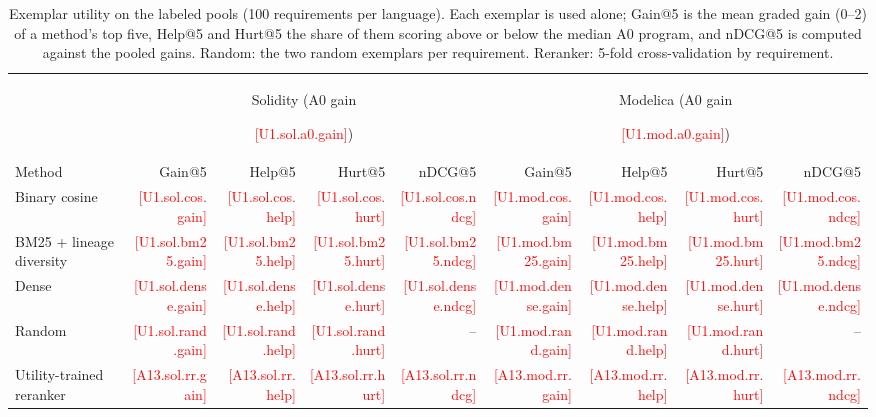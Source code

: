 \documentclass[runningheads]{llncs}
\newcommand{\tbd}[1]{\ifbool{submission}%
  {\PackageError{forge}{Unfilled placeholder #1}{See the runbook placeholder table.}}%
  {\mbox{\textcolor{red}{\textsf{\tiny[#1]}}}}}
\begin{document}
\begin{table}[t]
\centering
\caption{Exemplar utility on the labeled pools (100 requirements per language). Each exemplar is used alone; Gain@5 is the mean graded gain (0--2) of a method's top five, Help@5 and Hurt@5 the share of them scoring above or below the median A0 program, and nDCG@5 is computed against the pooled gains. Random: the two random exemplars per requirement. Reranker: 5-fold cross-validation by requirement.}
\label{tab:pool}
\scriptsize
\setlength{\tabcolsep}{3.5pt}
\begin{tabular}{@{}lrrrrrrrr@{}}
\toprule
 & \multicolumn{4}{c}{Solidity (A0 gain \tbd{U1.sol.a0.gain})} & \multicolumn{4}{c}{Modelica (A0 gain \tbd{U1.mod.a0.gain})} \\
\cmidrule(lr){2-5}\cmidrule(l){6-9}
Method & Gain@5 & Help@5 & Hurt@5 & nDCG@5 & Gain@5 & Help@5 & Hurt@5 & nDCG@5 \\
\midrule
Binary cosine & \tbd{U1.sol.cos.gain} & \tbd{U1.sol.cos.help} & \tbd{U1.sol.cos.hurt} & \tbd{U1.sol.cos.ndcg} & \tbd{U1.mod.cos.gain} & \tbd{U1.mod.cos.help} & \tbd{U1.mod.cos.hurt} & \tbd{U1.mod.cos.ndcg} \\
BM25 + lineage diversity & \tbd{U1.sol.bm25.gain} & \tbd{U1.sol.bm25.help} & \tbd{U1.sol.bm25.hurt} & \tbd{U1.sol.bm25.ndcg} & \tbd{U1.mod.bm25.gain} & \tbd{U1.mod.bm25.help} & \tbd{U1.mod.bm25.hurt} & \tbd{U1.mod.bm25.ndcg} \\
Dense & \tbd{U1.sol.dense.gain} & \tbd{U1.sol.dense.help} & \tbd{U1.sol.dense.hurt} & \tbd{U1.sol.dense.ndcg} & \tbd{U1.mod.dense.gain} & \tbd{U1.mod.dense.help} & \tbd{U1.mod.dense.hurt} & \tbd{U1.mod.dense.ndcg} \\
Random & \tbd{U1.sol.rand.gain} & \tbd{U1.sol.rand.help} & \tbd{U1.sol.rand.hurt} & -- & \tbd{U1.mod.rand.gain} & \tbd{U1.mod.rand.help} & \tbd{U1.mod.rand.hurt} & -- \\
\midrule
Utility-trained reranker & \tbd{A13.sol.rr.gain} & \tbd{A13.sol.rr.help} & \tbd{A13.sol.rr.hurt} & \tbd{A13.sol.rr.ndcg} & \tbd{A13.mod.rr.gain} & \tbd{A13.mod.rr.help} & \tbd{A13.mod.rr.hurt} & \tbd{A13.mod.rr.ndcg} \\
\bottomrule
\end{tabular}
\end{table}
\end{document}
